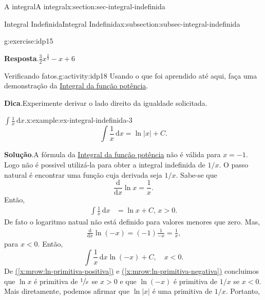 \documentclass[oneside,10pt,]{article}
\newcommand{\blocktitlefont}{\relax}
\newcommand{\xreffont}{\relax}
\numberwithin{equation}{section}
\newcommand{\dd}{\mathrm{d}}
\newcommand{\integral}[2]{\displaystyle\int {#1}\,\dd {#2}}
\newcommand{\lt}{<}
\newcommand{\gt}{>}
\newcommand{\amp}{&}
\begin{document}
\begin{sectionptx}{A integral}{}{A integral}{}{}{x:section:sec-integral-indefinida}
\begin{subsectionptx}{Integral Indefinida}{}{Integral Indefinida}{}{}{x:subsection:subsec-integral-indefinida}
\begin{inlineexercise}{}{g:exercise:idp15}
\par\smallskip%
\noindent\textbf{\blocktitlefont Resposta}.\hypertarget{g:answer:idp17}{}\quad{}\(\frac{3}{2}  x^{\frac{2}{3}} - x + 6\)%
\end{inlineexercise}
\begin{activity}{Verificando fatos.}{g:activity:idp18}%
Usando o que foi aprendido até aqui, faça uma demonstração da \hyperref[x:assemblage:prob-integral-funcao-potencia]{Integral da função potência}.%
\par\smallskip%
\noindent\textbf{\blocktitlefont Dica}.\hypertarget{g:hint:idp19}{}\quad{}Experimente derivar o lado direito da igualdade solicitada.%
\end{activity}
\begin{example}{\(\integral{\frac{1}{x}}{x}\).}{x:example:ex-integral-indefinida-3}%
%
\begin{equation*}
\integral{\frac{1}{x}}{x} = \ln{|x|} + C\text{.}
\end{equation*}
%
\par\smallskip%
\noindent\textbf{\blocktitlefont Solução}.\hypertarget{g:solution:idp20}{}\quad{}A fórmula da \hyperref[x:assemblage:prob-integral-funcao-potencia]{Integral da função potência} não é válida para \(x=-1\). Logo não é possivel utilizá-la para obter a integral indefinida de \(1/x\). O passo natural é encontrar uma função cuja derivada seja \(1/x\). Sabe-se que%
\begin{equation*}
\frac{\dd}{\dd x}\ln{x}= \frac{1}{x}\text{.}
\end{equation*}
Então,%
\begin{align}
\integral{\frac{1}{x}}{x} \amp= \ln{x} + C, \, x \gt 0  \text{.}\tag{\(\star\)}\label{x:mrow:ln-primitiva-positiva}
\end{align}
De fato o logaritmo natual não está definido para valores menores que zero. Mas,%
\begin{gather}
\frac{\dd}{\dd x}\ln{(-x)} = (-1)\frac{1}{-x}=\frac{1}{x}  \text{,}\tag{\(\star\star\)}\label{x:mrow:ln-primitiva-negativa}
\end{gather}
para \(x \lt 0\). Então,%
\begin{equation*}
\integral{\frac{1}{x}}{x}  \ln{(-x)} + C, \quad x \lt 0 \text{.}
\end{equation*}
De \hyperref[x:mrow:ln-primitiva-positiva]{({\xreffont\ref{x:mrow:ln-primitiva-positiva}})} e \hyperref[x:mrow:ln-primitiva-negativa]{({\xreffont\ref{x:mrow:ln-primitiva-negativa}})} concluimos que \(\ln{x}\) é primitiva de  \(\sfrac{1}{x}\) se \(x\gt 0\) e que  \(\ln{(-x)}\) é primitiva de \(1/x\) se \(x\lt 0\). Mais diretamente, podemos afirmar que \(\ln{|x|}\) é uma primitiva de \(1/x\). Portanto,%

\end{example}
\end{subsectionptx}
\end{sectionptx}
\end{document}
